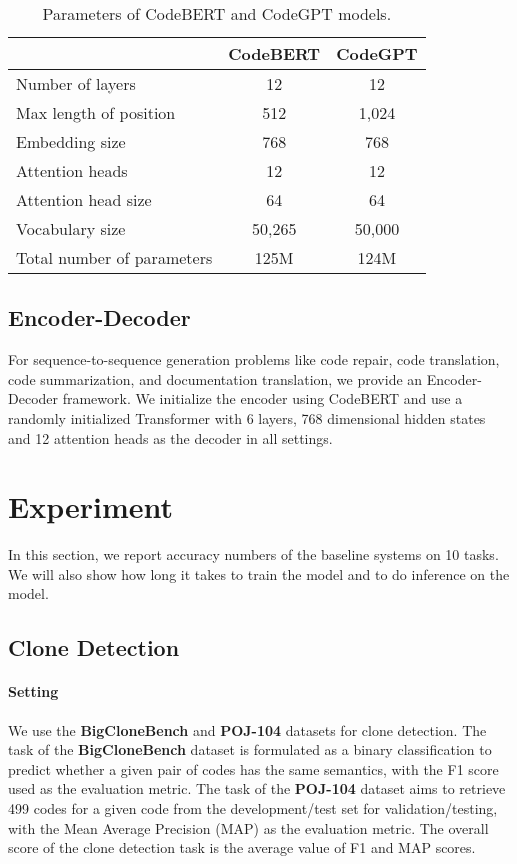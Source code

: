\documentclass[sigconf,nonacm,screen]{acmart}
\begin{document}
\begin{table}[h]
\centering
\caption{Parameters of CodeBERT and CodeGPT models.}
\label{table-model}
\begin{tabular}{lcc}
    \toprule
    & CodeBERT & CodeGPT  \\
    \midrule
    Number of layers           & 12 & 12     \\
    Max length of position     & 512 & 1,024   \\
    Embedding size             & 768 & 768   \\
Attention heads            & 12 & 12     \\
    Attention head size        & 64 & 64      \\
    Vocabulary size            & 50,265 & 50,000  \\
    Total number of parameters & 125M & 124M  \\
    \bottomrule 
\end{tabular}
\end{table}




\subsection{Encoder-Decoder}
For sequence-to-sequence generation problems like code repair, code translation, code summarization, and documentation translation, we provide an Encoder-Decoder framework. We initialize the encoder using CodeBERT \cite{feng2020codebert} and use a randomly initialized Transformer with 6 layers, 768 dimensional hidden states and 12 attention heads as the decoder in all settings. 



\section{Experiment}
In this section, we report accuracy numbers of the baseline systems on 10 tasks. 
We will also show how long it takes to train the model and to do inference on the model.


\subsection{Clone Detection}
\paragraph{Setting} 
We use the \textbf{BigCloneBench} and \textbf{POJ-104} datasets for clone detection. 
The task of the \textbf{BigCloneBench} dataset is formulated as a binary classification to predict whether a given pair of codes has the same semantics, with the F1 score used as the evaluation metric. The task of the \textbf{POJ-104} dataset aims to retrieve 499 codes for a given code from the development/test set for validation/testing, with the Mean Average Precision (MAP) as the evaluation metric.  
The overall score of the clone detection task is the average value of F1 and MAP scores. 
\end{document}

